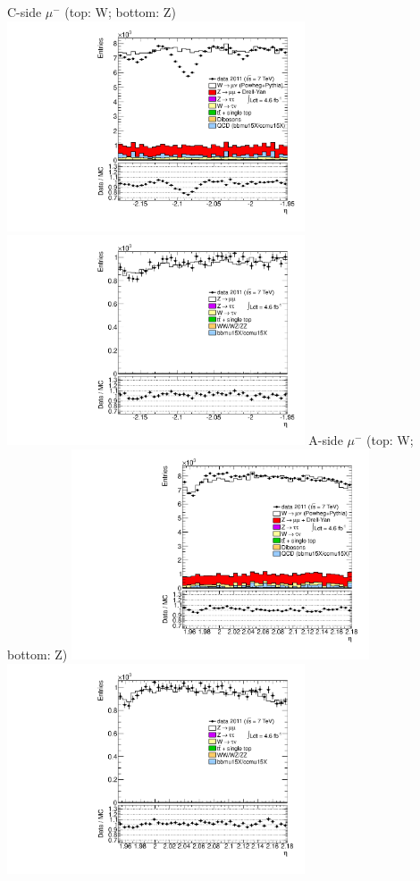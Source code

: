  {
\colb[T]
C-side $\mu^{-}$ (top: W; bottom: Z)
\centering
\includegraphics[width=0.66\textwidth]{dates/20130306/figures/both/Wnonmu_10_C_stack_l_eta_NEG} \\
\includegraphics[width=0.66\textwidth]{dates/20130306/figures/both/Z_10_C_stack_lN_eta_ALL.pdf}
A-side $\mu^{-}$ (top: W; bottom: Z)
\centering
\includegraphics[width=0.66\textwidth]{dates/20130306/figures/both/Wnonmu_10_A_stack_l_eta_NEG} \\
\includegraphics[width=0.66\textwidth]{dates/20130306/figures/both/Z_10_A_stack_lN_eta_ALL.pdf} 
\cole
}


